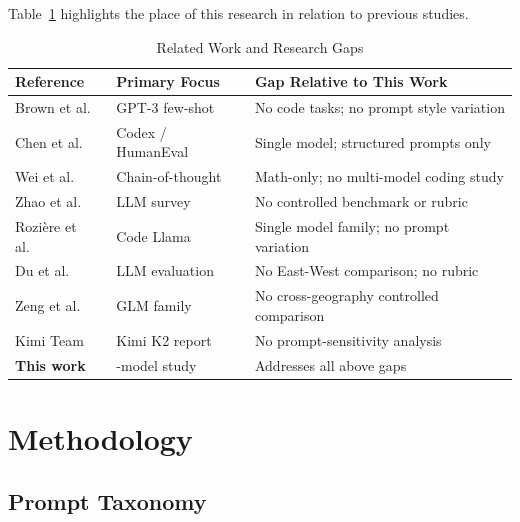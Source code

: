 \documentclass[conference]{IEEEtran}
\begin{document}
Table~\ref{tab:literature} highlights the place of this research in relation to previous studies.

\begin{table}[H]
\centering
\caption{Related Work and Research Gaps}
\label{tab:literature}
\renewcommand{\arraystretch}{1.3}
\begin{tabular}{>{\centering\arraybackslash}p{1.6cm}
                >{\centering\arraybackslash}p{2.0cm}
                >{\centering\arraybackslash}p{3.9cm}}
\toprule
\textbf{Reference} & \textbf{Primary Focus} & \textbf{Gap Relative to This Work} \\
\midrule
\rowcolor{headergray!50}
Brown et al.\ \cite{brown2020gpt3}     & GPT-3 few-shot      & No code tasks; no prompt style variation \\
Chen et al.\ \cite{chen2021codex}      & Codex / HumanEval   & Single model; structured prompts only \\
\rowcolor{headergray!50}
Wei et al.\ \cite{wei2022cot}          & Chain-of-thought    & Math-only; no multi-model coding study \\
Zhao et al.\ \cite{zhao2023survey}     & LLM survey          & No controlled benchmark or rubric \\
\rowcolor{headergray!50}
Rozière et al.\ \cite{roziere2023codellama} & Code Llama     & Single model family; no prompt variation \\
Du et al.\ \cite{du2024llmeval}        & LLM evaluation      & No East-West comparison; no rubric \\
\rowcolor{headergray!50}
Zeng et al.\ \cite{zeng2024chatglm}    & GLM family          & No cross-geography controlled comparison \\
Kimi Team \cite{kimiteam2025k2}        & Kimi K2 report      & No prompt-sensitivity analysis \\
\rowcolor{headergray!50}
\textbf{This work}                     & 6-model study       & Addresses all above gaps \\
\bottomrule
\end{tabular}
\end{table}

\section{Methodology}
\label{sec:method}

\subsection{Prompt Taxonomy}
\end{document}
